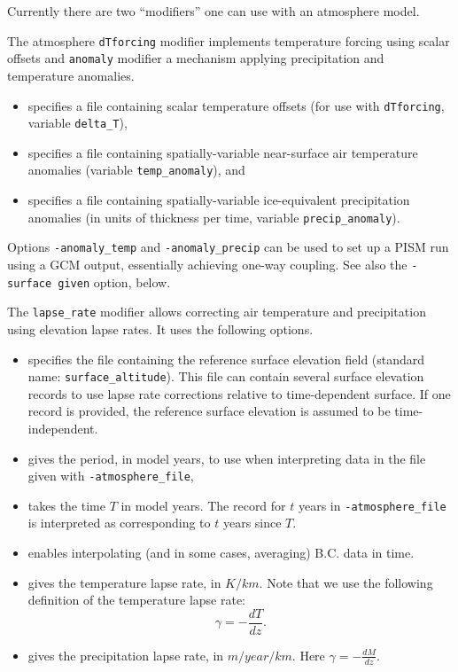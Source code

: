   Currently there are two ``modifiers'' one can use with an atmosphere model.

  The atmosphere \texttt{dTforcing} modifier implements temperature forcing using scalar offsets and \texttt{anomaly} modifier a mechanism applying precipitation and temperature anomalies.
  \begin{itemize}
  \item {} specifies a file containing scalar temperature offsets (for use with \texttt{dTforcing}, variable \texttt{delta_T}), 
  \item {} specifies a file containing spatially-variable near-surface air temperature anomalies (variable \texttt{temp_anomaly}), and
  \item {} specifies a file containing spatially-variable ice-equivalent precipitation anomalies (in units of thickness per time, variable \texttt{precip_anomaly}).
  \end{itemize}

  Options \texttt{-anomaly_temp} and \texttt{-anomaly_precip} can be used to set up a PISM run using a GCM output, essentially achieving one-way coupling. See also the \texttt{-surface given} option, below.

 The \texttt{lapse_rate} modifier allows correcting air temperature and precipitation using elevation lapse rates. It uses the following options.
  \begin{itemize}
  \item {} specifies the file containing the reference surface elevation field (standard name: \texttt{surface_altitude}). This file can contain several surface elevation records to use lapse rate corrections relative to time-dependent surface. If one record is provided, the reference surface elevation is assumed to be time-independent.
  \item {} gives the period, in model years, to use when interpreting data in the file given with \texttt{-atmosphere_file},
  \item {} takes the time $T$ in model years. The record for $t$ years in \texttt{-atmosphere_file} is interpreted as corresponding to $t$ years since $T$.
  \item {} enables interpolating (and in some cases, averaging) B.C. data in time.
  \item {} gives the temperature lapse rate, in $K/km$. Note that we use the following definition of the temperature lapse rate:
    \begin{displaymath}
      \gamma = -\frac{dT}{dz}.
    \end{displaymath}
  \item {} gives the precipitation lapse rate, in $m/year/km$. Here $\gamma = -\frac{dM}{dz}$.
  \end{itemize}

